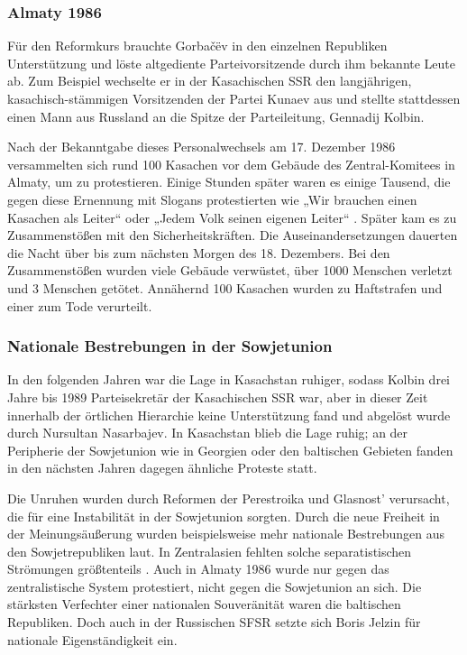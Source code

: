 \documentclass[12pt,headsepline,a4paper]{scrartcl}
\begin{document}
\subsubsection{Almaty 1986}
Für den Reformkurs brauchte Gorbačëv in den einzelnen Republiken Unterstützung
und löste altgediente Parteivorsitzende durch ihm bekannte Leute ab. Zum Beispiel
wechselte er in der Kasachischen SSR den langjährigen, kasachisch-stämmigen
Vorsitzenden der Partei Kunaev aus und stellte stattdessen einen Mann aus Russland an
die Spitze der Parteileitung, Gennadij Kolbin.

Nach der Bekanntgabe dieses Personalwechsels am 17. Dezember 1986
versammelten sich rund 100 Kasachen vor dem Gebäude des Zentral-Komitees in
Almaty, um zu protestieren. Einige Stunden später waren es einige Tausend, die gegen
diese Ernennung mit Slogans protestierten wie „Wir brauchen einen Kasachen als
Leiter“ oder „Jedem Volk seinen eigenen Leiter“ \autocite{trut1994} . Später kam es zu Zusammenstößen
mit den Sicherheitskräften. Die Auseinandersetzungen dauerten die Nacht über bis zum
nächsten Morgen des 18. Dezembers. Bei den Zusammenstößen wurden viele Gebäude
verwüstet, über 1000 Menschen verletzt und 3 Menschen getötet. Annähernd 100
Kasachen wurden zu Haftstrafen und einer zum Tode verurteilt.

\subsubsection{Nationale Bestrebungen in der Sowjetunion}
In den folgenden Jahren war die Lage in Kasachstan ruhiger, sodass Kolbin drei
Jahre bis 1989 Parteisekretär der Kasachischen SSR war, aber in dieser Zeit innerhalb der
örtlichen Hierarchie keine Unterstützung fand und abgelöst wurde durch Nursultan
Nasarbajev. In Kasachstan blieb die Lage ruhig; an der Peripherie der
Sowjetunion wie in Georgien oder den baltischen Gebieten fanden in den nächsten
Jahren dagegen ähnliche Proteste statt.

Die Unruhen wurden durch Reformen der Perestroika und Glasnost' verursacht, die
für eine Instabilität in der Sowjetunion sorgten. Durch die neue Freiheit in der
Meinungsäußerung wurden beispielsweise mehr nationale Bestrebungen aus den
Sowjetrepubliken laut. In Zentralasien fehlten solche separatistischen Strömungen
größtenteils \autocite[43]{zaslav1991}. Auch in Almaty 1986 wurde nur gegen das zentralistische System
protestiert, nicht gegen die Sowjetunion an sich. Die stärksten Verfechter einer
nationalen Souveränität waren die baltischen Republiken. Doch auch in der Russischen
SFSR setzte sich Boris Jelzin für nationale Eigenständigkeit ein.
\end{document}
